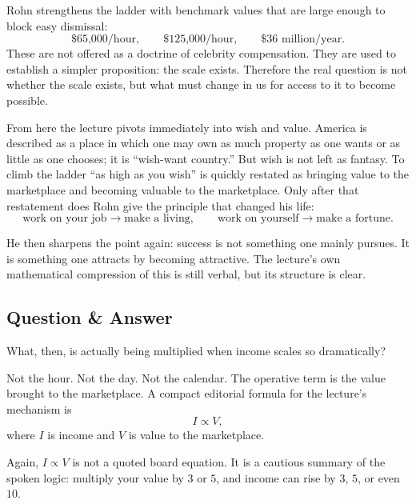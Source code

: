 Rohn strengthens the ladder with benchmark values that are large enough to block easy dismissal:
\begin{equation}
\text{\$65{,}000/hour}, \qquad \text{\$125{,}000/hour}, \qquad \text{\$36 million/year}.
\end{equation}
These are not offered as a doctrine of celebrity compensation. They are used to establish a simpler proposition: the scale exists. Therefore the real question is not whether the scale exists, but what must change in us for access to it to become possible.

From here the lecture pivots immediately into wish and value. America is described as a place in which one may own as much property as one wants or as little as one chooses; it is ``wish-want country.'' But wish is not left as fantasy. To climb the ladder ``as high as you wish'' is quickly restated as bringing value to the marketplace and becoming valuable to the marketplace. Only after that restatement does Rohn give the principle that changed his life:
\begin{equation}
\text{work on your job} \to \text{make a living}, \qquad
\text{work on yourself} \to \text{make a fortune}.
\end{equation}

He then sharpens the point again: success is not something one mainly pursues. It is something one attracts by becoming attractive. The lecture's own mathematical compression of this is still verbal, but its structure is clear.

\subsection{Question \& Answer}

What, then, is actually being multiplied when income scales so dramatically?

Not the hour. Not the day. Not the calendar. The operative term is the value brought to the marketplace. A compact editorial formula for the lecture's mechanism is
\begin{equation}
I \propto V,
\end{equation}
where \(I\) is income and \(V\) is value to the marketplace.

\begin{remark}
Again, \(I \propto V\) is not a quoted board equation. It is a cautious summary of the spoken logic: multiply your value by \(3\) or \(5\), and income can rise by \(3\), \(5\), or even \(10\).
\end{remark}

